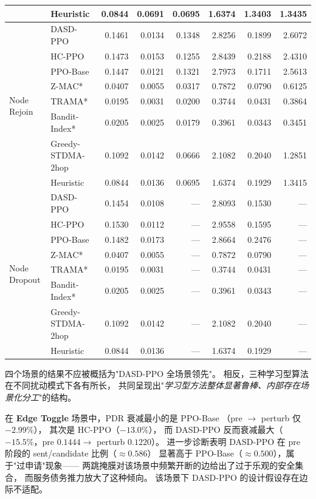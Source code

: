 \begin{table}[H]
{\begin{tabular}{@{}llrrrrrr@{}}
  & Heuristic         & 0.0844 & 0.0691 & 0.0695 & 1.6374 & 1.3403 & 1.3435 \\
\midrule
\multirow{8}{*}{Node Rejoin}
  & DASD-PPO          & 0.1461 & 0.0134 & 0.1348 & 2.8256 & 0.1899 & 2.6072 \\
  & HC-PPO            & 0.1473 & 0.0153 & 0.1255 & 2.8439 & 0.2188 & 2.4310 \\
  & PPO-Base          & 0.1447 & 0.0121 & 0.1321 & 2.7973 & 0.1711 & 2.5613 \\
  & Z-MAC*            & 0.0407 & 0.0055 & 0.0317 & 0.7872 & 0.0790 & 0.6125 \\
  & TRAMA*            & 0.0195 & 0.0031 & 0.0200 & 0.3744 & 0.0431 & 0.3864 \\
  & Bandit-Index*     & 0.0205 & 0.0025 & 0.0179 & 0.3961 & 0.0343 & 0.3451 \\
  & Greedy-STDMA-2hop & 0.1092 & 0.0142 & 0.0666 & 2.1082 & 0.2040 & 1.2851 \\
  & Heuristic         & 0.0844 & 0.0136 & 0.0695 & 1.6374 & 0.1929 & 1.3415 \\
\midrule
\multirow{8}{*}{Node Dropout}
  & DASD-PPO          & 0.1454 & 0.0108 & ---    & 2.8093 & 0.1530 & --- \\
  & HC-PPO            & 0.1530 & 0.0112 & ---    & 2.9558 & 0.1595 & --- \\
  & PPO-Base          & 0.1482 & 0.0173 & ---    & 2.8664 & 0.2476 & --- \\
  & Z-MAC*            & 0.0407 & 0.0055 & ---    & 0.7872 & 0.0790 & --- \\
  & TRAMA*            & 0.0195 & 0.0031 & ---    & 0.3744 & 0.0431 & --- \\
  & Bandit-Index*     & 0.0205 & 0.0025 & ---    & 0.3961 & 0.0343 & --- \\
  & Greedy-STDMA-2hop & 0.1092 & 0.0142 & ---    & 2.1082 & 0.2040 & --- \\
  & Heuristic         & 0.0844 & 0.0136 & ---    & 1.6374 & 0.1929 & --- \\
\bottomrule
\end{tabular}%
}
\end{table}

四个场景的结果不应被概括为"DASD-PPO 全场景领先"。
相反，三种学习型算法在不同扰动模式下各有所长，
共同呈现出"\emph{学习型方法整体显著鲁棒、内部存在场景化分工}"的结构。

在 \textbf{Edge Toggle} 场景中，PDR 衰减最小的是 PPO-Base
（pre $\rightarrow$ perturb 仅 $-2.99\%$），
其次是 HC-PPO（$-13.0\%$），
而 DASD-PPO 反而衰减最大（$-15.5\%$，pre $0.1444 \rightarrow$ perturb $0.1220$）。
进一步诊断表明 DASD-PPO 在 pre 阶段的 sent/candidate 比例（$\approx 0.586$）
显著高于 PPO-Base（$\approx 0.500$），属于"过申请"现象——
两跳掩膜对该场景中频繁开断的边给出了过于乐观的安全集合，
而服务债务推力放大了这种倾向。
该场景下 DASD-PPO 的设计假设存在边际不适配。

